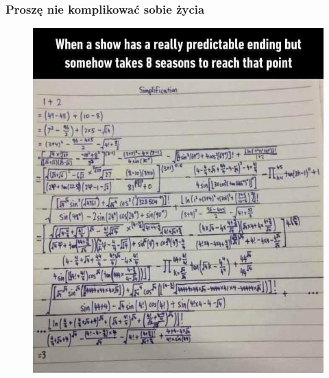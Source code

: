 \documentclass[10pt,t]{beamer}
\begin{document}
\begin{frame}
  \frametitle{Proszę nie komplikować sobie życia}


  \begin{figure}

    \centering


    \includegraphics[scale=0.25]
    {./PresentationsPictures/Dont-complicate-your-life-02.jpg}

  \end{figure}

\end{frame}
\end{document}
